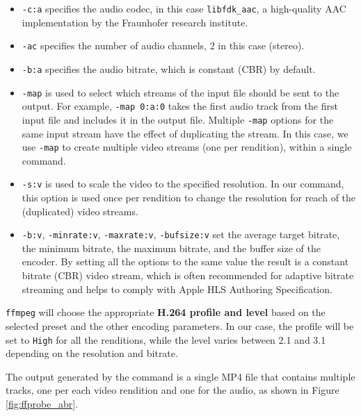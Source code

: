 \begin{itemize}
    \item \texttt{-c:a} specifies the audio codec, in this case \texttt{libfdk\_aac}, a high-quality AAC implementation by the Fraunhofer research institute.
    \item \texttt{-ac} specifies the number of audio channels, 2 in this case (stereo).
    \item \texttt{-b:a} specifies the audio bitrate, which is constant (CBR) by default.
    \item \texttt{-map} is used to select which streams of the input file should be sent to the output. For example, \texttt{-map 0:a:0} takes the first audio track from the first input file and includes it in the output file. Multiple \texttt{-map} options for the same input stream have the effect of duplicating the stream. In this case, we use \texttt{-map} to create multiple video streams (one per rendition), within a single command.
    \item \texttt{-s:v} is used to scale the video to the specified resolution. In our command, this option is used once per rendition to change the resolution for reach of the (duplicated) video streams.
    \item \texttt{-b:v}, \texttt{-minrate:v}, \texttt{-maxrate:v}, \texttt{-bufsize:v} set the average target bitrate, the minimum bitrate, the maximum bitrate, and the buffer size of the encoder. By setting all the options to the same value the result is a constant bitrate (CBR) video stream, which is often recommended for adaptive bitrate streaming and helps to comply with Apple HLS Authoring Specification.\cite{ozer}\cite{hlsauthoring}
\end{itemize}

\texttt{ffmpeg} will choose the appropriate \textbf{H.264 profile and level} based on the selected preset and the other encoding parameters. In our case, the profile will be set to \texttt{High} for all the renditions, while the level varies between 2.1 and 3.1 depending on the resolution and bitrate.

The output generated by the command is a single MP4 file that contains multiple tracks, one per each video rendition and one for the audio, as shown in Figure \ref{fig:ffprobe_abr}.

